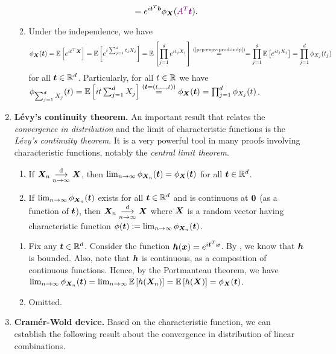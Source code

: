 \begin{enumerate}
\begin{pf}
\begin{enumerate}
\[=e^{i\vect{t}^{T}\vect{b}}\phi_{\vect{X}}(\vc{A^{T}\vect{t}}).\]
\item Under the independence, we have
\[
\phi_{\vect{X}}(\vect{t})=\expv{e^{i\vect{t}^{T}\vect{X}}}
=\expv{e^{i\sum_{j=1}^{d}t_jX_j}}
=\expv{\prod_{j=1}^{d}e^{it_jX_j}}
\overset{(\text{\Cref{prp:expv-prod-indp}})}{=}
=\prod_{j=1}^{d}\expv{e^{it_jX_j}}
=\prod_{j=1}^{d}\phi_{X_j}(t_{j})
\]
for all \(\bm{t}\in\mathbb{R}^{d}\). Particularly, for all \(t\in\mathbb{R}\) we have
\(\phi_{\sum_{j=1}^{d}X_j}(t)=\mathbb{E}\left[it\sum_{j=1}^{d}X_j\right]
\overset{(\bm{t}=(t,\dotsc,t))}{=}
\phi_{\bm{X}}(\bm{t})
=\prod_{j=1}^{d}\phi_{X_j}(t)
\).
\end{enumerate}
\end{pf}
\item \textbf{L\'evy's continuity theorem.} An important result that relates
the \emph{convergence in distribution} and the limit of characteristic functions
is the \emph{L\'evy's continuity theorem}. It is a very powerful tool in many
proofs involving characteristic functions, notably the \emph{central limit
theorem}.

\begin{theorem}
\label{thm:levy-cont}
\hfill
\begin{enumerate}
\item If \(\bm{X}_n\underset{n\to\infty}{\overset{\text{d}}{\longrightarrow}} \bm{X}\), then 
\(\lim_{n\to\infty}\phi_{\bm{X}_n}(\bm{t})
=\phi_{\bm{X}}(\bm{t})\) for all \(\bm{t}\in\mathbb{R}^{d}\).
\item If \(\lim_{n\to\infty}\phi_{\bm{X}_n}(\bm{t})\) exists for all
\(\bm{t}\in\mathbb{R}^{d}\) and is continuous at \(\bm{0}\) (as a function of
\(\bm{t}\)), then \(\bm{X}_n\underset{n\to\infty}{\overset{\text{d}}{\longrightarrow}}\bm{X}\) where \(\bm{X}\) is a
random vector having characteristic function \(\phi(\bm{t}):=
\lim_{n\to\infty}\phi_{\bm{X}_n}(\bm{t})\).
\end{enumerate}
\end{theorem}
\begin{pf}
\begin{enumerate}
\item Fix any \(\bm{t}\in\mathbb{R}^{d}\). Consider the function
\(\bm{h}(\bm{x})=e^{i\bm{t}^{T}\bm{x}}\). By , we
know that \(\bm{h}\) is bounded. Also, note that \(\bm{h}\) is
continuous, as a composition of continuous functions. Hence, by the Portmanteau
theorem, we have \(\lim_{n\to\infty}\phi_{\bm{X}_n}(\bm{t})
=\lim_{n\to\infty}\mathbb{E}\left[h(\bm{X}_n)\right]
=\mathbb{E}\left[h(\bm{X})\right]=\phi_{\bm{X}}(\bm{t})\).
\item Omitted.
\end{enumerate}
\end{pf}
\item \textbf{Cram\'er-Wold device.} Based on the characteristic function, we
can establish the following result about the convergence in
distribution of linear combinations.


\end{enumerate}
